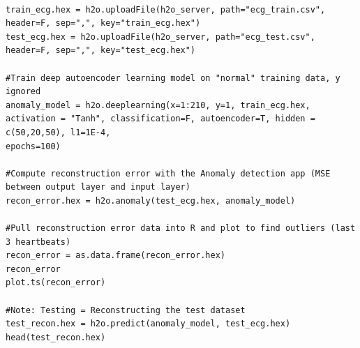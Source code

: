 \documentclass{article}[11pt]
\begin{document}
\begin{lstlisting}[breaklines,basicstyle=\ttfamily]

train_ecg.hex = h2o.uploadFile(h2o_server, path="ecg_train.csv", header=F, sep=",", key="train_ecg.hex") 
test_ecg.hex = h2o.uploadFile(h2o_server, path="ecg_test.csv", header=F, sep=",", key="test_ecg.hex") 

#Train deep autoencoder learning model on "normal" training data, y ignored 
anomaly_model = h2o.deeplearning(x=1:210, y=1, train_ecg.hex, activation = "Tanh", classification=F, autoencoder=T, hidden = c(50,20,50), l1=1E-4, 
epochs=100)                 
                              
#Compute reconstruction error with the Anomaly detection app (MSE between output layer and input layer)
recon_error.hex = h2o.anomaly(test_ecg.hex, anomaly_model)
                              
#Pull reconstruction error data into R and plot to find outliers (last 3 heartbeats)
recon_error = as.data.frame(recon_error.hex)
recon_error
plot.ts(recon_error)

#Note: Testing = Reconstructing the test dataset
test_recon.hex = h2o.predict(anomaly_model, test_ecg.hex) 
head(test_recon.hex)              

\end{lstlisting}
\noindent

\newpage
\end{document}
